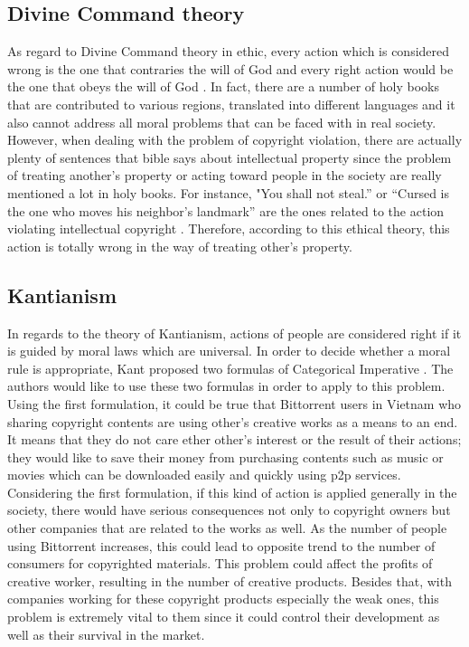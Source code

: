 \documentclass[conference]{IEEEtran}
\begin{document}
\subsection{Divine Command theory}
As regard to Divine Command theory in ethic, every action which is considered wrong is the one that
contraries the will of God and every right action would be the one that obeys the will of God \cite{quinn2014ethics}. In fact, there are a number of holy books that are contributed to various regions, translated into different languages and it also cannot address all moral problems that can be faced with in real society. However, when dealing with the problem of copyright violation, there are actually plenty of sentences that bible says about intellectual property since the problem of treating another’s property or acting toward people in the society are really mentioned a lot in holy books. For instance, "You shall not steal.” \cite{exodus2015} or “Cursed is the one who moves his neighbor's landmark”\cite{deuteronomy2717} are the ones related to the action violating intellectual copyright \cite{bibleip}. Therefore, according to this ethical theory, this action is totally wrong in the way of treating other’s property.

\subsection{Kantianism}
In regards to the theory of Kantianism, actions of people are considered right if it is guided by moral laws which are universal. In order to decide whether a moral rule is appropriate, Kant proposed two formulas of Categorical Imperative \cite{quinn2014ethics}. The authors would like to use these two formulas in order to apply to this problem. Using the first formulation, it could be true that Bittorrent users in Vietnam who sharing copyright contents are using other’s creative works as a means to an end. It means that they do not care ether other’s interest or the result of their actions; they would like to save their money from purchasing contents such as music or movies which can be downloaded easily and quickly using p2p services. Considering the first formulation, if this kind of action is applied generally in the society, there would have serious consequences not only to copyright owners but other companies that are related to the works as well. As the number of people using Bittorrent increases, this could lead to opposite trend to the number of consumers for copyrighted materials. This problem could affect the profits of creative worker, resulting in the number of creative products. Besides that, with companies working for these copyright products especially the weak ones, this problem is extremely vital to them since it could control their development as well as their survival in the market.
\end{document}
